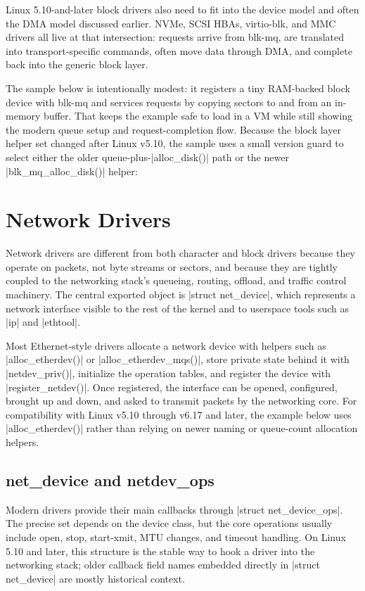 \documentclass[10pt, oneside]{book}
\begin{document}
Linux 5.10-and-later block drivers also need to fit into the device model and often the DMA
model discussed earlier.
NVMe, SCSI HBAs, virtio-blk, and MMC drivers all live at that intersection:
requests arrive from blk-mq, are translated into transport-specific commands,
often move data through DMA, and complete back into the generic block layer.

The sample below is intentionally modest: it registers a tiny RAM-backed block
device with blk-mq and services requests by copying sectors to and from an
in-memory buffer.
That keeps the example safe to load in a VM while still showing the modern
queue setup and request-completion flow.
Because the block layer helper set changed after Linux v5.10, the sample uses a
small version guard to select either the older queue-plus-\cpp|alloc_disk()|
path or the newer \cpp|blk_mq_alloc_disk()| helper:


\section{Network Drivers}
\label{sec:network}
Network drivers are different from both character and block drivers because they
operate on packets, not byte streams or sectors, and because they are tightly
coupled to the networking stack's queueing, routing, offload, and traffic
control machinery.
The central exported object is \cpp|struct net_device|, which represents a
network interface visible to the rest of the kernel and to userspace tools such
as \sh|ip| and \sh|ethtool|.

Most Ethernet-style drivers allocate a network device with helpers such as
\cpp|alloc_etherdev()| or \cpp|alloc_etherdev_mqs()|, store private state behind it with
\cpp|netdev_priv()|, initialize the operation tables, and register the device
with \cpp|register_netdev()|.
Once registered, the interface can be opened, configured, brought up and down,
and asked to transmit packets by the networking core.
For compatibility with Linux v5.10 through v6.17 and later, the example below
uses \cpp|alloc_etherdev()| rather than relying on newer naming or queue-count
allocation helpers.

\subsection{net\_device and netdev\_ops}
\label{sec:net_device}
Modern drivers provide their main callbacks through \cpp|struct net_device_ops|.
The precise set depends on the device class, but the core operations usually
include open, stop, start-xmit, MTU changes, and timeout handling.
On Linux 5.10 and later, this structure is the stable way to hook a driver into the
networking stack; older callback field names embedded directly in
\cpp|struct net_device| are mostly historical context.
\end{document}
